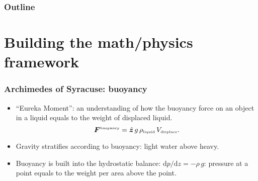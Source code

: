 \documentclass[10pt]{beamer}
\begin{document}
 \begin{frame}
   \frametitle{Outline}
   \tableofcontents
 \end{frame}


\section{Building the math/physics framework}


\begin{frame}
  \frametitle{Archimedes of Syracuse: buoyancy}

\begin{center}
\vspace{-.25cm}
\hspace{2cm}  
\end{center}

\begin{exampleblock}{}
\begin{itemize}
\item ``Eureka Moment'': an understanding of how the buoyancy force on an object in a
  liquid equals to the weight of displaced liquid.
\begin{equation}
 {\bm F}^{\mbox{\tiny buoyancy}} = \hat{\bm z} \, g \, \rho_{\mbox{\tiny liquid}} \, V_{\mbox{\tiny displace}}.
\end{equation}

\item Gravity stratifies according to buoyancy: light water above heavy.

\item Buoyancy is built into the hydrostatic balance:
  $\mathrm{d} p/\mathrm{d} z = -\rho \, g$: pressure at a point equals
  to the weight per area above the point.

\end{itemize}
\end{exampleblock}{}

\end{frame}
\end{document}
